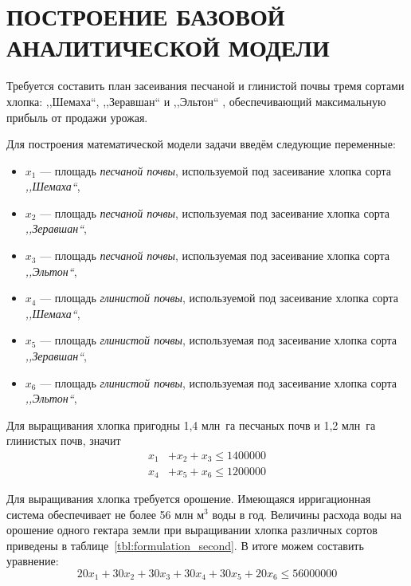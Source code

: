 \section{ПОСТРОЕНИЕ БАЗОВОЙ АНАЛИТИЧЕСКОЙ МОДЕЛИ}

Требуется составить план засеивания песчаной и глинистой почвы тремя сортами хлопка: ,,Шемаха``, ,,Зеравшан`` и ,,Эльтон`` , обеспечивающий максимальную прибыль от продажи урожая.

Для построения математической модели задачи введём следующие переменные:

\begin{itemize}

\item
  $ x_{1} $ --- площадь \textsl{песчаной почвы}, используемой под засеивание хлопка сорта \textsl{,,Шемаха``},
\item
  $ x_{2} $ --- площадь \textsl{песчаной почвы}, используемая под засеивание хлопка сорта \textsl{,,Зеравшан``},
\item
  $ x_{3} $ --- площадь \textsl{песчаной почвы}, используемая под засеивание хлопка сорта \textsl{,,Эльтон``},
\item
  $ x_{4} $ --- площадь \textsl{глинистой почвы}, используемой под засеивание хлопка сорта \textsl{,,Шемаха``},
\item
  $ x_{5} $ --- площадь \textsl{глинистой почвы}, используемая под засеивание хлопка сорта \textsl{,,Зеравшан``},
\item
  $ x_{6} $ --- площадь \textsl{глинистой почвы}, используемая под засеивание хлопка сорта \textsl{,,Эльтон``},

\end{itemize}

Для выращивания хлопка пригодны 1,4 млн~га песчаных почв и 1,2 млн~га глинистых почв, значит
\begin{align}
  \label{eq:limit_pesok}
  x_{1} &+ x_{2} + x_{3} \le 1 400 000 \\
  \label{eq:limit_glina}
  x_{4} &+ x_{5} + x_{6} \le 1 200 000 
\end{align}

Для выращивания хлопка требуется орошение. Имеющаяся ирригационная система обеспечивает не более 56 млн $ \text{м}^3 $ воды в год. Величины расхода воды на орошение одного гектара земли при выращивании хлопка различных сортов приведены в таблице~\ref{tbl:formulation_second}. В итоге можем составить уравнение:
\begin{equation}
  \label{eq:limit_voda}
  20x_1 + 30x_2 + 30x_3 + 30x_4 + 30x_5 + 20x_6 \le 56 000 000 
\end{equation}

